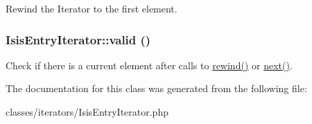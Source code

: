 \label{classIsisEntryIterator_a985e88cdfb69b42e3389f24c08b2404a}
Rewind the Iterator to the first element. \hypertarget{classIsisEntryIterator_aff9e54b112cc728b7cd6cf00c0359c49}{
\subsubsection[{valid}]{\setlength{\rightskip}{0pt plus 5cm}IsisEntryIterator::valid ()}}
\label{classIsisEntryIterator_aff9e54b112cc728b7cd6cf00c0359c49}
Check if there is a current element after calls to \hyperlink{classIsisEntryIterator_a985e88cdfb69b42e3389f24c08b2404a}{rewind()} or \hyperlink{classIsisEntryIterator_a2d1d0fe5d3c22d1720e93e03952b877d}{next()}. 

The documentation for this class was generated from the following file:\begin{DoxyCompactItemize}
\item 
classes/iterators/IsisEntryIterator.php\end{DoxyCompactItemize}
